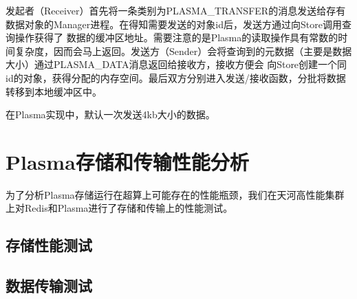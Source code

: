 发起者（Receiver）首先将一条类别为PLASMA\_TRANSFER的消息发送给存有数据对象的Manager进程。在得知需要发送的对象id后，发送方通过向Store调用查询操作获得了
数据的缓冲区地址。需要注意的是Plasma的读取操作具有常数的时间复杂度，因而会马上返回。发送方（Sender）会将查询到的元数据（主要是数据大小）通过PLASMA\_DATA消息返回给接收方，接收方便会
向Store创建一个同id的对象，获得分配的内存空间。最后双方分别进入发送/接收函数，分批将数据转移到本地缓冲区中。

在Plasma实现中，默认一次发送4kb大小的数据。

\section{Plasma存储和传输性能分析}

为了分析Plasma存储运行在超算上可能存在的性能瓶颈，我们在天河高性能集群上对Redis和Plasma进行了存储和传输上的性能测试。

\subsection{存储性能测试}

\subsection{数据传输测试}